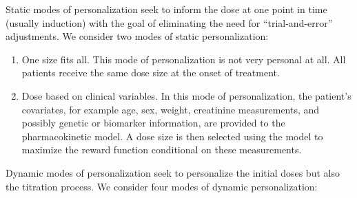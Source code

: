 Static modes of personalization seek to inform the dose at one point in time (usually induction) with the goal of eliminating the need for ``trial-and-error'' adjustments.  We consider two modes of static personalization:

\begin{enumerate}
	\item One size fits all.  This mode of personalization is not very personal at all.  All patients receive the same dose size at the onset of treatment.
	\item Dose based on clinical variables.  In this mode of personalization, the patient's covariates, for example age, sex, weight, creatinine measurements, and possibly genetic or biomarker information, are provided to the pharmacokinetic model.  A dose size is then selected using the model to maximize the reward function conditional on these measurements.
\end{enumerate}

Dynamic modes of personalization seek to personalize the initial doses but also the titration process.  We consider four modes of dynamic personalization:

